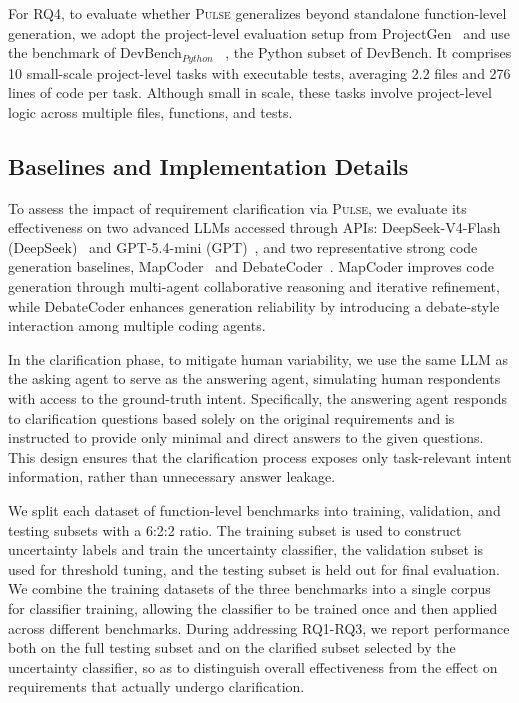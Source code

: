 For RQ4, to evaluate whether \textsc{Pulse} generalizes beyond standalone function-level generation, we adopt the project-level evaluation setup from ProjectGen~\cite{zhao2025projectgen} and use the benchmark of DevBench$_{Python}$ ~\cite{li2025devbench}, the Python subset of DevBench.  It comprises 10 small-scale project-level tasks with executable tests, averaging 2.2 files and 276 lines of code per task. Although small in scale, these tasks involve project-level logic across multiple files, functions, and tests.


\subsection{Baselines and Implementation Details}
To assess the impact of requirement clarification via \textsc{Pulse}, we evaluate its effectiveness on two advanced LLMs accessed through APIs: DeepSeek-V4-Flash (DeepSeek)~\cite{deepseekai2026deepseekv4} and GPT-5.4-mini (GPT)~\cite{openai2026gpt54system}, and two representative strong code generation baselines, MapCoder~\cite{islam2024mapcoder} and DebateCoder~\cite{chen2025debatecoder}. MapCoder improves code generation through multi-agent collaborative reasoning and iterative refinement, while DebateCoder enhances generation reliability by introducing a debate-style interaction among multiple coding agents.

In the clarification phase, to mitigate human variability, we use the same LLM as the asking agent to serve as the answering agent, simulating human respondents with access to the ground-truth intent. Specifically, the answering agent responds to clarification questions based solely on the original requirements and is instructed to provide only minimal and direct answers to the given questions. This design ensures that the clarification process exposes only task-relevant intent information, rather than unnecessary answer leakage.

We split each dataset of function-level benchmarks into training, validation, and testing subsets with a 6:2:2 ratio. The training subset is used to construct uncertainty labels and train the uncertainty classifier, the validation subset is used for threshold tuning, and the testing subset is held out for final evaluation. We combine the training datasets of the three benchmarks into a single corpus for classifier training, allowing the classifier to be trained once and then applied across different benchmarks. During addressing RQ1-RQ3, we report performance both on the full testing subset and on the clarified subset selected by the uncertainty classifier, so as to distinguish overall effectiveness from the effect on requirements that actually undergo clarification.